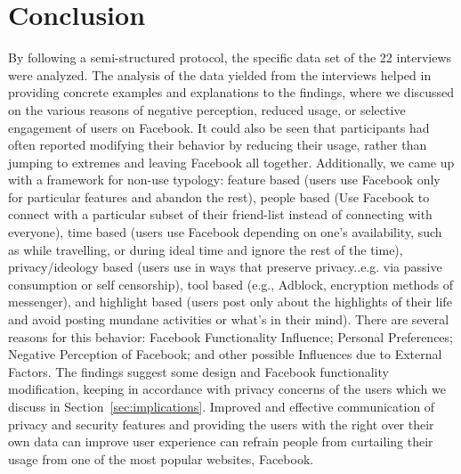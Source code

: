 \section{Conclusion}
\label{sec:conclusion}
By following a semi-structured protocol, the specific data set of the 22 interviews were analyzed. The analysis of the data yielded from the interviews helped in providing concrete examples and explanations to the findings, where we discussed on the various reasons of negative perception, reduced usage, or selective engagement of users on Facebook. It could also be seen that participants had often reported modifying their behavior by reducing their usage, rather than jumping to extremes and leaving Facebook all together. Additionally, we came up with a framework for non-use typology: feature based (users use Facebook only for particular features and abandon the rest), people based (Use Facebook to connect with a particular subset of their friend-list instead of connecting with everyone), time based (users use Facebook depending on one's availability, such as while travelling, or during ideal time and ignore the rest of the time), privacy/ideology based (users use in ways that preserve privacy..e.g. via passive consumption or self censorship), tool based (e.g., Adblock, encryption methods of messenger), and highlight based (users post only about the highlights of their life and avoid posting mundane activities or what's in their mind). There are several reasons for this behavior: Facebook Functionality Influence; Personal Preferences; Negative Perception of Facebook; and other possible Influences due to External Factors. The findings suggest some design and Facebook functionality modification, keeping in accordance with privacy concerns of the users which we discuss in Section~\ref{sec:implications}. Improved and effective communication of privacy and security features and providing the users with the right over their own data can improve user experience can refrain people from curtailing their usage from one of the most popular websites, Facebook.